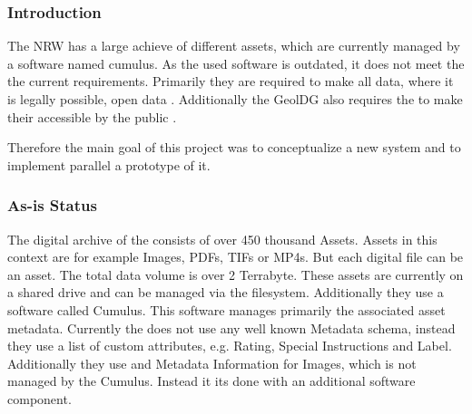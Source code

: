 \documentclass[11pt, titlepage, a4paper]{article}
\begin{document}
\subsubsection{Introduction}
The   NRW has a large achieve of different assets, which are currently managed by a software named cumulus. As the used software is outdated, it does not meet the the current requirements.
Primarily they  are required to make all data, where it is legally possible, open data \cite{GesetzZurForderung2017}.
Additionally the GeolDG also requires the  to make their accessible by the public \cite{GesetzZurStaatlichen2020}.

Therefore the main goal of this project was to conceptualize a new system and to implement parallel a prototype of it.
\subsubsection{As-is Status}
The digital archive of the   consists of over 450 thousand Assets. Assets in this context are for example Images, PDFs, TIFs or MP4s. But each digital file can be an asset. The total data volume is over 2 Terrabyte.
These assets are currently on a shared drive and can be managed via the filesystem. Additionally they use a software called Cumulus. This software manages primarily the associated asset metadata. Currently the  does not use any well known Metadata schema, instead they use a list of custom attributes, e.g. Rating, Special Instructions and Label.
Additionally they use  and  Metadata Information for Images, which is not managed by the Cumulus. Instead it its done with an additional software component. %
\end{document}
